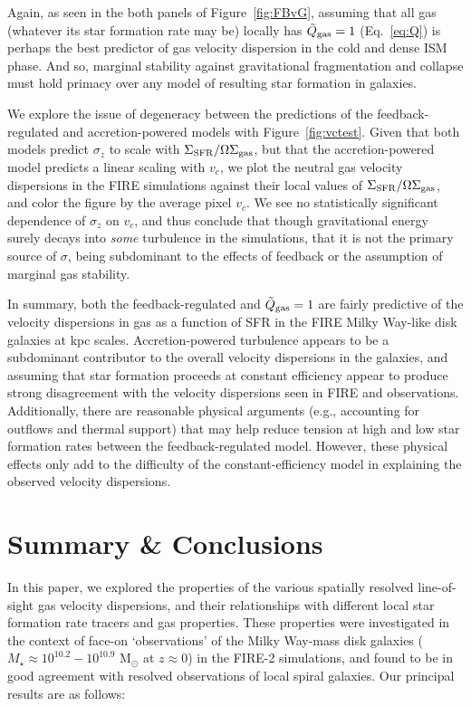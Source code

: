 \documentclass[usletter,fleqn,usenatbib]{mnras}
\begin{document}
Again, as seen in the both panels of Figure~\ref{fig:FBvG}, assuming that all gas (whatever its star formation rate may be) locally has $\tilde Q_{\rm gas} = 1$ (Eq.~\ref{eq:Q}) is perhaps the best predictor of gas velocity dispersion in the cold and dense ISM phase.  And so, marginal stability against gravitational fragmentation and collapse must hold primacy over any model of resulting star formation in galaxies.

We explore the issue of degeneracy between the predictions of the feedback-regulated and accretion-powered models with Figure~\ref{fig:vctest}.  Given that both models predict $\sigma_z$ to scale with $\Sigma_{\rm SFR}/\Omega\Sigma_{\rm gas}$, but that the accretion-powered model predicts a linear scaling with $v_c$, we plot the neutral gas velocity dispersions in the FIRE simulations against their local values of $\Sigma_{\rm SFR}/\Omega\Sigma_{\rm gas}$, and color the figure by the average pixel $v_c$.  We see no statistically significant dependence of $\sigma_z$ on $v_c$, and thus conclude that though gravitational energy surely decays into \emph{some} turbulence in the simulations, that it is not the primary source of $\sigma$, being subdominant to the effects of feedback or the assumption of marginal gas stability.

In summary, both the feedback-regulated and $\tilde Q_{\rm gas} = 1$ are fairly predictive of the velocity dispersions in gas as a function of SFR in the FIRE Milky Way-like disk galaxies at kpc scales.   Accretion-powered turbulence appears to be a subdominant contributor to the overall velocity dispersions in the galaxies, and assuming that star formation proceeds at constant efficiency appear to produce strong disagreement with the velocity dispersions seen in FIRE and observations. Additionally, there are reasonable physical arguments (e.g., accounting for outflows and thermal support) that may help reduce tension at high and low star formation rates between the feedback-regulated model.  However, these physical effects only add to the difficulty of the constant-efficiency model in explaining the observed velocity dispersions.  




\section{Summary \& Conclusions}

In this paper, we explored the properties of the various spatially resolved line-of-sight gas velocity dispersions, and their relationships with different local star formation rate tracers and gas properties.  These properties were investigated in the context of face-on `observations' of the Milky Way-mass disk galaxies ($M_\star \approx 10^{10.2}-10^{10.9}$ M$_\odot$ at $z\approx 0$) in the FIRE-2 simulations, and found to be in good agreement with resolved observations of local spiral galaxies.  Our principal results are as follows:
\end{document}
